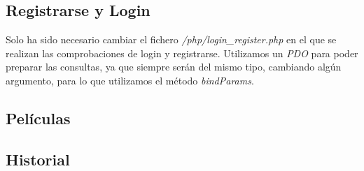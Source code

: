\documentclass[nochap]{apuntes}
\begin{document}
\subsection{Registrarse y Login}

Solo ha sido necesario cambiar el fichero \textit{/php/login_register.php} en el que se realizan las comprobaciones de login y registrarse. Utilizamos un \textit{PDO} para poder preparar las consultas, ya que siempre serán del mismo tipo, cambiando algún argumento, para lo que utilizamos el método \textit{bindParams}.

\subsection{Películas}
\subsection{Historial}
\end{document}
